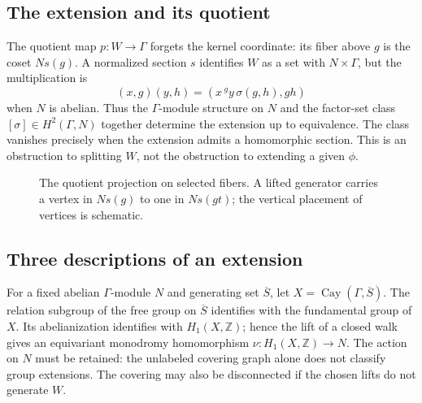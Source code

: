 \documentclass[12pt,letterpaper]{article}
\numberwithin{equation}{section}
\theoremstyle{plain}
\theoremstyle{definition}
\newcommand{\Z}{\mathbb{Z}}
\newcommand{\act}[2]{{}^{#1}\!#2}          %
\DeclareMathOperator{\Cay}{Cay}
\begin{document}
\subsection{The extension and its quotient}

The quotient map $p:W\to\Gamma$ forgets the kernel coordinate: its fiber above $g$ is the coset $Ns(g)$. A normalized section $s$ identifies $W$ as a set with $N\times\Gamma$, but the multiplication is
\[
(x,g)(y,h)=(x\,\act{g}{y}\,\sigma(g,h),gh)
\]
when $N$ is abelian. Thus the $\Gamma$-module structure on $N$ and the factor-set class $[\sigma]\in H^2(\Gamma,N)$ together determine the extension up to equivalence. The class vanishes precisely when the extension admits a homomorphic section. This is an obstruction to splitting $W$, not the obstruction to extending a given $\phi$.

\begin{figure}[ht]
\centering
{}
\caption{The quotient projection on selected fibers. A lifted generator carries a vertex in $Ns(g)$ to one in $Ns(gt)$; the vertical placement of vertices is schematic.}
\label{fig:quotient-fibers}
\end{figure}

\subsection{Three descriptions of an extension}

For a fixed abelian $\Gamma$-module $N$ and generating set $\overline S$, let $X=\Cay(\Gamma,\overline S)$. The relation subgroup of the free group on $\overline S$ identifies with the fundamental group of $X$. Its abelianization identifies with $H_1(X,\Z)$; hence the lift of a closed walk gives an equivariant monodromy homomorphism $\nu:H_1(X,\Z)\to N$. The action on $N$ must be retained: the unlabeled covering graph alone does not classify group extensions. The covering may also be disconnected if the chosen lifts do not generate $W$.
\end{document}
